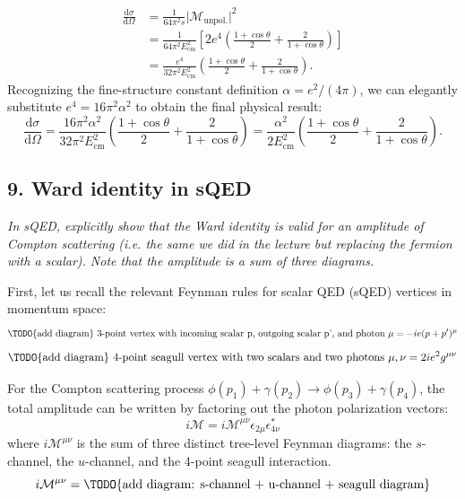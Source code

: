 \[
    \begin{aligned}
        \frac{\mathrm{d} \sigma}{\mathrm{d} \Omega} & = \frac{1}{64 \pi^2 s} \vert \mathcal{M}_{\text{unpol.}} \vert^2                                                               \\
                                                    & = \frac{1}{64 \pi^2 E_{\text{cm}}^2} \left[ 2 e^4 \left( \frac{1 + \cos \theta}{2} + \frac{2}{1 + \cos \theta} \right) \right] \\
                                                    & = \frac{e^4}{32 \pi^2 E_{\text{cm}}^2} \left( \frac{1 + \cos \theta}{2} + \frac{2}{1 + \cos \theta} \right).
    \end{aligned}
\]
Recognizing the fine-structure constant definition $\alpha = e^2 / (4\pi)$, we can elegantly substitute $e^4 = 16\pi^2 \alpha^2$ to obtain the final physical result:
\[
    \frac{\mathrm{d} \sigma}{\mathrm{d} \Omega} = \frac{16 \pi^2 \alpha^2}{32 \pi^2 E_{\text{cm}}^2} \left( \frac{1 + \cos \theta}{2} + \frac{2}{1 + \cos \theta} \right) = \frac{\alpha^2}{2 E_{\text{cm}}^2} \left( \frac{1 + \cos \theta}{2} + \frac{2}{1 + \cos \theta} \right).
\]


\subsection*{9. Ward identity in sQED}

\begin{center}
    \textit{In sQED, explicitly show that the Ward identity is valid for an amplitude of Compton scattering (i.e. the same we did in the lecture but replacing the fermion with a scalar). Note that the amplitude is a sum of three diagrams.}
\end{center}

First, let us recall the relevant Feynman rules for scalar QED (sQED) vertices in momentum space:
\[
    \text{\TODO{add diagram} 3-point vertex with incoming scalar p, outgoing scalar p', and photon $\mu$} = -ie(p + p')^\mu
\]
\[
    \text{\TODO{add diagram} 4-point seagull vertex with two scalars and two photons $\mu, \nu$} = 2ie^2 g^{\mu\nu}
\]

For the Compton scattering process $\phi(p_1) + \gamma(p_2) \to \phi(p_3) + \gamma(p_4)$, the total amplitude can be written by factoring out the photon polarization vectors:
\[
    i\mathcal{M} = i \mathcal{M}^{\mu \nu} \epsilon_{2\mu} \epsilon_{4\nu}^*
\]
where $i\mathcal{M}^{\mu\nu}$ is the sum of three distinct tree-level Feynman diagrams: the $s$-channel, the $u$-channel, and the 4-point seagull interaction.
\[
    i\mathcal{M}^{\mu\nu} = \text{\TODO{add diagram: s-channel + u-channel + seagull diagram}}
\]

